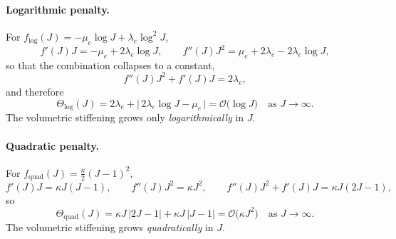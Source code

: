 \paragraph{Logarithmic penalty.}
For $f_{\log}(J)=-\mu_e\log J+\lambda_e\log^2 J$,
\begin{equation}
    f'(J)J = -\mu_e + 2\lambda_e\log J,
    \qquad
    f''(J)J^2 = \mu_e + 2\lambda_e - 2\lambda_e\log J,
\end{equation}
so that the combination collapses to a constant,
\begin{equation}
    \label{eq:logcombo}
    f''(J)J^2 + f'(J)J = 2\lambda_e,
\end{equation}
and therefore
\begin{equation}
    \label{eq:Thetalog}
    \Theta_{\log}(J) = 2\lambda_e + \big|\,2\lambda_e\log J - \mu_e\,\big| = \mathcal{O}\!\big(\log J\big)
    \quad\text{as } J\to\infty .
\end{equation}
The volumetric stiffening grows only \emph{logarithmically} in $J$.

\paragraph{Quadratic penalty.}
For $f_{\mathrm{quad}}(J)=\tfrac{\kappa}{2}(J-1)^2$,
\begin{equation}
    f'(J)J = \kappa J(J-1),
    \qquad
    f''(J)J^2 = \kappa J^2,
    \qquad
    f''(J)J^2 + f'(J)J = \kappa J(2J-1),
\end{equation}
so
\begin{equation}
    \label{eq:Thetaquad}
    \Theta_{\mathrm{quad}}(J) = \kappa J\,|2J-1| + \kappa J\,|J-1| = \mathcal{O}\!\big(\kappa J^2\big)
    \quad\text{as } J\to\infty .
\end{equation}
The volumetric stiffening grows \emph{quadratically} in $J$.

